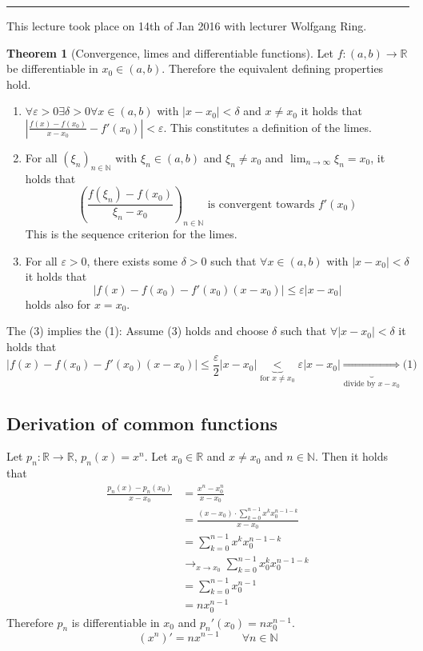 \documentclass[a4paper,landscape,twocolumn]{article}
\theoremstyle{definition}
\newtheorem{theorem}{Theorem}
\newcommand\abs[1]{\left|#1\right|}
\newcommand\seq[1]{{\left(#1\right)}_{n \in \mathbb N}}
\newcommand\meta[3]{\hrule{} This #1 took place on #2 with lecturer #3.\par}
\begin{document}
\meta{lecture}{14th of Jan 2016}{Wolfgang Ring}
%
\begin{theorem}[Convergence, limes and differentiable functions]
  Let $f: (a, b) \to \mathbb R$ be differentiable in $x_0 \in (a, b)$.
  Therefore the equivalent defining properties hold.
  \begin{enumerate}
    \item $\forall \varepsilon > 0 \exists \delta > 0 \forall x \in (a, b)$
      with $\abs{x - x_0} < \delta$ and $x \neq x_0$ it holds that
      $\abs{\frac{f(x) - f(x_0)}{x - x_0} - f'(x_0)} < \varepsilon$.
      This constitutes a definition of the limes.
    \item For all $\seq{\xi_n}$ with $\xi_n \in (a, b)$ and $\xi_n \neq x_0$
      and $\lim_{n\to\infty} \xi_n = x_0$, it holds that
      \[
        \left(\frac{f(\xi_n) - f(x_0)}{\xi_n - x_0}\right)_{n\in\mathbb N}
        \text{ is convergent towards } f'(x_0)
      \]
      This is the sequence criterion for the limes.
    \item For all $\varepsilon > 0$, there exists some $\delta > 0$ such
      that $\forall x \in (a, b)$ with $\abs{x - x_0} < \delta$ it holds that
      \[ \abs{f(x) - f(x_0) - f'(x_0)(x - x_0)} \leq \varepsilon \abs{x - x_0} \]
      holds also for $x = x_0$.
  \end{enumerate}
  The (3) implies the (1): Assume (3) holds and
  choose $\delta$ such that $\forall \abs{x - x_0} < \delta$ it holds that
  \[
    \abs{f(x) - f(x_0) - f'(x_0)(x - x_0)}
    \leq \frac\varepsilon2 \abs{x - x_0}
    \underbrace{<}_{\text{for } x \neq x_0} \varepsilon \abs{x - x_0}
    \underbrace{\Rightarrow}_{\text{divide by $x - x_0$}} \text{(1)}
  \]
\end{theorem}

\subsection{Derivation of common functions}
%
Let $p_n: \mathbb R \to \mathbb R$, $p_n(x) = x^n$. Let $x_0 \in \mathbb R$ and $x \neq x_0$ and $n \in \mathbb N$.
Then it holds that
\begin{align*}
  \frac{p_n(x) - p_n(x_0)}{x - x_0}
    &= \frac{x^n - x_0^n}{x - x_0} \\
    &= \frac{(x - x_0) \cdot \sum_{k=0}^{n - 1} x^k x_0^{n-1-k}}{x - x_0} \\
    &= \sum_{k=0}^{n-1} x^k x_0^{n-1-k} \\
    &\to_{x \to x_0} \sum_{k=0}^{n-1} x_0^k x_0^{n-1-k} \\
    &= \sum_{k=0}^{n-1} x_0^{n-1} \\
    &= n x_0^{n-1}
\end{align*}
Therefore $p_n$ is differentiable in $x_0$ and $p_n'(x_0) = n x_0^{n-1}$.
\[ (x^n)' = nx^{n-1} \qquad \forall n \in \mathbb N \]
\end{document}
